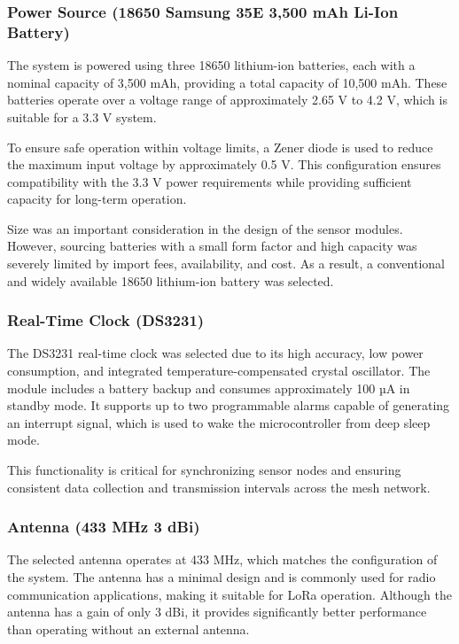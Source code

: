 \subsubsection{Power Source (18650 Samsung 35E 3,500 mAh Li-Ion
Battery)}

The system is powered using three 18650 lithium-ion
batteries, each with a nominal capacity of 3,500 mAh, providing a total
capacity of 10,500 mAh. These batteries operate over a voltage range of
approximately 2.65 V to 4.2 V, which is suitable for a 3.3 V
system.


To ensure safe operation within voltage limits, a Zener diode
is used to reduce the maximum input voltage by approximately 0.5 V. This
configuration ensures compatibility with the 3.3 V power requirements
while providing sufficient capacity for long-term
operation.


Size was an important consideration in the design of the sensor modules.
However, sourcing batteries with a small form factor and high capacity
was severely limited by import fees, availability, and cost. As a
result, a conventional and widely available 18650 lithium-ion battery
was selected.

\subsubsection{Real-Time Clock
(DS3231)}

The DS3231 real-time clock was selected due to its high accuracy, low
power consumption, and integrated temperature-compensated crystal
oscillator. The module includes a battery backup and consumes
approximately 100 µA in standby mode. It supports up to two programmable
alarms capable of generating an interrupt signal, which is used to wake
the microcontroller from deep sleep mode.

This functionality is critical for synchronizing sensor nodes and
ensuring consistent data collection and transmission intervals across
the mesh network.

\subsubsection{Antenna (433 MHz
3 dBi)}

The selected antenna operates at 433 MHz, which matches the
configuration of the system. The antenna has a minimal design and is
commonly used for radio communication applications, making it suitable
for LoRa operation. Although the antenna has a gain of only 3 dBi, it
provides significantly better performance than operating without an
external antenna.

